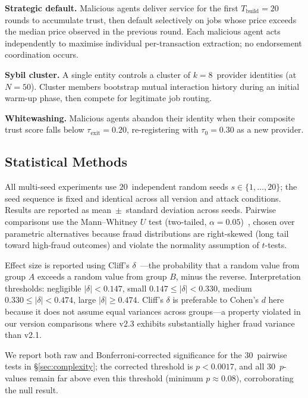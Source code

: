 \documentclass[sigconf,nonacm,10pt]{acmart}
\begin{document}
\noindent\textbf{Strategic default.}
Malicious agents deliver service for the first
$T_{\text{build}} = 20$ rounds to accumulate trust, then default
selectively on jobs whose price exceeds the median price observed
in the previous round. Each malicious agent acts independently to
maximise individual per-transaction extraction; no endorsement
coordination occurs.

\noindent\textbf{Sybil cluster.}
A single entity controls a cluster of $k = 8$~provider identities
(at $N{=}50$). Cluster members bootstrap mutual interaction
history during an initial warm-up phase, then compete for
legitimate job routing.

\noindent\textbf{Whitewashing.}
Malicious agents abandon their identity when their composite trust
score falls below $\tau_{\text{exit}} = 0.20$, re-registering with
$\tau_0 = 0.30$ as a new provider.

\subsection{Statistical Methods}
\label{sec:stats}

All multi-seed experiments use $20$~independent random seeds
$s \in \{1, \ldots, 20\}$; the seed sequence is fixed and
identical across all version and attack conditions. Results are
reported as mean~$\pm$~standard deviation across seeds. Pairwise
comparisons use the Mann--Whitney $U$ test
(two-tailed, $\alpha = 0.05$)~\cite{mann1947test}, chosen over
parametric alternatives because fraud distributions are
right-skewed (long tail toward high-fraud outcomes) and violate
the normality assumption of $t$-tests.

Effect size is reported using Cliff's
$\delta$~\cite{romano2006appropriate}---the probability that a
random value from group $A$ exceeds a random value from group $B$,
minus the reverse. Interpretation thresholds: negligible
$|\delta| < 0.147$, small $0.147 \le |\delta| < 0.330$, medium
$0.330 \le |\delta| < 0.474$, large $|\delta| \ge 0.474$. Cliff's
$\delta$ is preferable to Cohen's $d$ here because it does not
assume equal variances across groups---a property violated in our
version comparisons where v2.3 exhibits substantially higher fraud
variance than v2.1.

We report both raw and Bonferroni-corrected significance for the
30~pairwise tests in \S\ref{sec:complexity}; the corrected
threshold is $p < 0.0017$, and all 30~$p$-values remain far above
even this threshold (minimum $p \approx 0.08$), corroborating the
null result.
\end{document}
